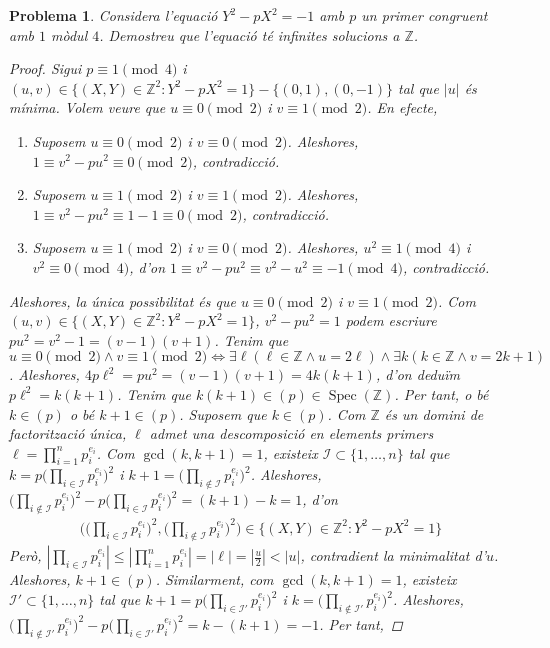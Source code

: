 \documentclass[compress]{article}
\newtheorem{problema}{Problema}
\theoremstyle{definition}
\DeclareMathOperator{\Spec}{Spec}
\begin{document}
\begin{problema}
    Considera l'equació $Y^{2}-pX^{2}=-1$ amb $p$ un primer congruent amb $1$ mòdul $4$. Demostreu que l'equació té infinites solucions a $\mathbb{Z}$.
    \begin{proof}
        Sigui $p\equiv1\pmod{4}$ i $(u,v)\in\{(X,Y)\in\mathbb{Z}^{2}:Y^{2}-pX^{2}=1\}-\{(0,1),(0,-1)\}$ tal que $|u|$ és mínima. Volem veure que $u\equiv0\pmod{2}$ i $v\equiv1\pmod{2}$. En efecte,
        \begin{enumerate}
            \item Suposem $u\equiv0\pmod{2}$ i $v\equiv0\pmod{2}$. Aleshores, $1\equiv v^{2}-pu^{2}\equiv0\pmod{2}$, contradicció.
            \item Suposem $u\equiv1\pmod{2}$ i $v\equiv1\pmod{2}$. Aleshores, $1\equiv v^{2}-pu^{2}\equiv1-1\equiv0\pmod{2}$, contradicció.
            \item Suposem $u\equiv1\pmod{2}$ i $v\equiv0\pmod{2}$. Aleshores, $u^{2}\equiv1\pmod{4}$ i $v^{2}\equiv0\pmod{4}$, d'on $1\equiv v^{2}-pu^{2}\equiv v^{2}-u^{2}\equiv-1\pmod{4}$, contradicció.
        \end{enumerate}
        Aleshores, la única possibilitat és que $u\equiv0\pmod{2}$ i $v\equiv1\pmod{2}$.\newline
        Com $(u,v)\in\{(X,Y)\in\mathbb{Z}^{2}:Y^{2}-pX^{2}=1\}$, $v^{2}-pu^{2}=1$ podem escriure $pu^{2}=v^{2}-1=(v-1)(v+1)$. Tenim que $u\equiv0\pmod{2}\land v\equiv1\pmod{2}\iff\exists\ell(\ell\in\mathbb{Z}\land u=2\ell)\land\exists k(k\in\mathbb{Z}\land v=2k+1)$. Aleshores, $4p\ell^{2}=pu^{2}=(v-1)(v+1)=4k(k+1)$, d'on deduïm $ p\ell^{2}=k(k+1)$. Tenim que $k(k+1)\in(p)\in\Spec(\mathbb{Z})$. Per tant, o bé $k\in(p)$ o bé $k+1\in(p)$. Suposem que $k\in(p)$. Com $\mathbb{Z}$ és un domini de factorització única, $\ell$ admet una descomposició en elements primers $\ell=\prod_{i=1}^{n}p_{i}^{e_{i}}$. Com $\gcd(k,k+1)=1$, existeix $\mathscr{I}\subset\{1,\ldots,n\}$ tal que $k=p\big(\prod_{i\in\mathscr{I}}p_{i}^{e_{i}}\big)^{2}$ i $k+1=\big(\prod_{i\notin\mathscr{I}}p_{i}^{e_{i}}\big)^{2}$. Aleshores, $\big(\prod_{i\notin\mathscr{I}}p_{i}^{e_{i}}\big)^{2}-p\big(\prod_{i\in\mathscr{I}}p_{i}^{e_{i}}\big)^{2}=(k+1)-k=1$, d'on
        \begin{align*}
            \textstyle{\big(\big(\prod_{i\in\mathscr{I}}p_{i}^{e_{i}}\big)^{2},\big(\prod_{i\notin\mathscr{I}}p_{i}^{e_{i}}\big)^{2}\big)}
            \in\{(X,Y)\in\mathbb{Z}^{2}:Y^{2}-pX^{2}=1\}
        \end{align*}
        Però, $|\prod_{i\in\mathscr{I}}p_{i}^{e_{i}}|\leq|\prod_{i=1}^{n}p_{i}^{e_{i}}|=|\ell|=|\frac{u}{2}|<|u|$, contradient la minimalitat d'$u$. Aleshores, $k+1\in(p)$. Similarment, com $\gcd(k,k+1)=1$, existeix $\mathscr{I}'\subset\{1,\ldots,n\}$ tal que $k+1=p\big(\prod_{i\in\mathscr{I}'}p_{i}^{e_{i}}\big)^{2}$ i $k=\big(\prod_{i\notin\mathscr{I}'}p_{i}^{e_{i}}\big)^{2}$. Aleshores, $\big(\prod_{i\notin\mathscr{I}'}p_{i}^{e_{i}}\big)^{2}-p\big(\prod_{i\in\mathscr{I}'}p_{i}^{e_{i}}\big)^{2}=k-(k+1)=-1$. Per tant,

\end{proof}
\end{problema}
\end{document}
